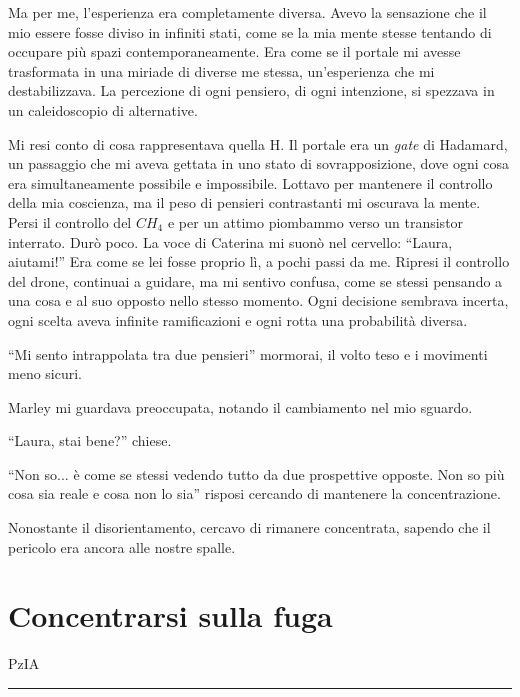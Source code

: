 Ma per me, l'esperienza era completamente diversa. Avevo la sensazione che il mio essere fosse diviso in infiniti stati, come se la mia mente stesse tentando di occupare più spazi contemporaneamente. Era come se il portale mi avesse trasformata in una miriade di diverse me stessa, un'esperienza che mi destabilizzava. La percezione di ogni pensiero, di ogni intenzione, si spezzava in un caleidoscopio di alternative.

Mi resi conto di cosa rappresentava quella H. Il portale era un \textit{gate} di Hadamard, un passaggio che mi aveva gettata in uno stato di sovrapposizione, dove ogni cosa era simultaneamente possibile e impossibile. Lottavo per mantenere il controllo della mia coscienza, ma il peso di pensieri contrastanti mi oscurava la mente.
Persi il controllo del $CH_4$ e per un attimo piombammo verso un transistor interrato. Durò poco. La voce di Caterina mi suonò nel cervello: ``Laura, aiutami!'' Era come se lei fosse proprio lì, a pochi passi da me.
Ripresi il controllo del drone, continuai a guidare, ma mi sentivo confusa, come se stessi pensando a una cosa e al suo opposto nello stesso momento. Ogni decisione sembrava incerta,  ogni scelta aveva infinite ramificazioni e ogni rotta una probabilità diversa.

\begin{dialogue}
 \enquote{Mi sento intrappolata tra due pensieri} mormorai, il volto teso e i movimenti meno sicuri.
\end{dialogue}

Marley mi guardava preoccupata, notando il cambiamento nel mio sguardo.

\begin{dialogue}
 \enquote{Laura, stai bene?} chiese.
\end{dialogue}

\begin{dialogue}
 \enquote{Non so... è come se stessi vedendo tutto da due prospettive opposte. Non so più cosa sia reale e cosa non lo sia} risposi cercando di mantenere la concentrazione.
\end{dialogue}

Nonostante il disorientamento, cercavo di rimanere concentrata, sapendo che il pericolo era ancora alle nostre spalle.
\newpage
\section{Concentrarsi sulla fuga}
\vspace{1em}
\begin{center}PzIA\end{center}
\hrule
\vspace{1em}


